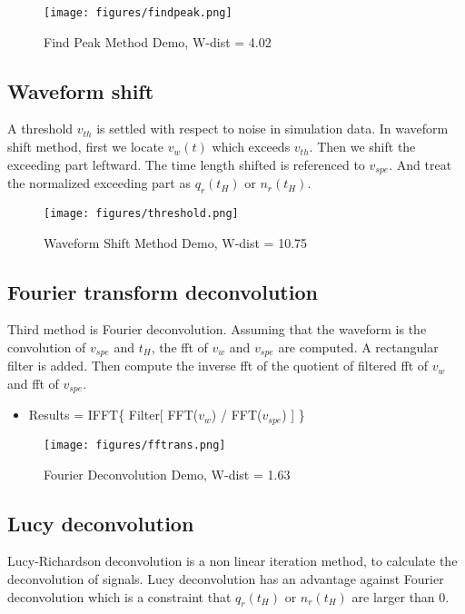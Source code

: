 \begin{figure}[H]
    \centering
    \texttt{[image: figures/findpeak.png]}
    \caption{Find Peak Method Demo, W-dist = 4.02}
\end{figure}

\subsection{Waveform shift}
A threshold $v_{th}$ is settled with respect to noise in simulation data. In waveform shift method, first we locate $v_{w}(t)$ which exceeds $v_{th}$. Then we shift the exceeding part leftward. The time length shifted is referenced to $v_{spe}$. And treat the normalized exceeding part as $q_{r}(t_{H})$ or $n_{r}(t_{H})$. 

\begin{figure}[H]
    \centering
    \texttt{[image: figures/threshold.png]}
    \caption{Waveform Shift Method Demo, W-dist = 10.75}
\end{figure}

\subsection{Fourier transform deconvolution}
Third method is Fourier deconvolution. Assuming that the waveform is the convolution of $v_{spe}$ and $t_{H}$, the fft of $v_{w}$ and $v_{spe}$ are computed. A rectangular filter is added. Then compute the inverse fft of the quotient of filtered fft of $v_{w}$ and fft of $v_{spe}$. 

\begin{itemize}
    \item Results = IFFT\{ Filter[ FFT($v_{w}$) / FFT($v_{spe}$) ] \}
\end{itemize}

\begin{figure}[H]
    \centering
    \texttt{[image: figures/fftrans.png]}
    \caption{Fourier Deconvolution Demo, W-dist = 1.63}
\end{figure}

\subsection{Lucy deconvolution}
Lucy-Richardson deconvolution is a non linear iteration method, to calculate the deconvolution of signals. Lucy deconvolution has an advantage against Fourier deconvolution which is a constraint that $q_{r}(t_{H})$ or $n_{r}(t_{H})$ are larger than 0. 

